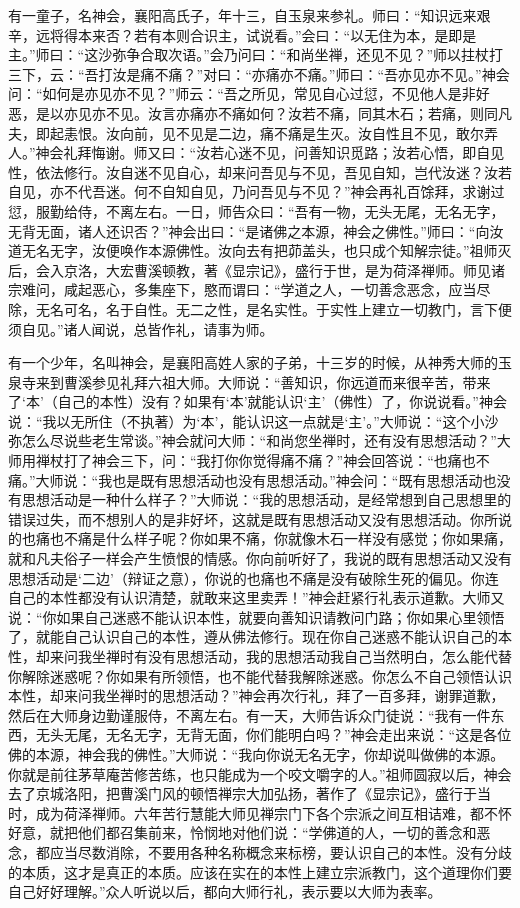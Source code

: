 \documentclass[12pt,twoside,openany]{book}
\newcommand{\kai}[1]{{\CJKfamily{kai}#1}}
\begin{document}
有一童子，名神会，襄阳高氏子，年十三，自玉泉来参礼。师曰：“知识远来艰辛，远将得本来否？若有本则合识主，试说看。”会曰：“以无住为本，是即是主。”师曰：“这沙弥争合取次语。”会乃问曰：“和尚坐禅，还见不见？”师以拄杖打三下，云：“吾打汝是痛不痛？”对曰：“亦痛亦不痛。”师曰：“吾亦见亦不见。”神会问：“如何是亦见亦不见？”师云：“吾之所见，常见自心过愆，不见他人是非好恶，是以亦见亦不见。汝言亦痛亦不痛如何？汝若不痛，同其木石；若痛，则同凡夫，即起恚恨。汝向前，见不见是二边，痛不痛是生灭。汝自性且不见，敢尔弄人。”神会礼拜悔谢。师又曰：“汝若心迷不见，问善知识觅路；汝若心悟，即自见性，依法修行。汝自迷不见自心，却来问吾见与不见，吾见自知，岂代汝迷？汝若自见，亦不代吾迷。何不自知自见，乃问吾见与不见？”神会再礼百馀拜，求谢过愆，服勤给侍，不离左右。一日，师告众曰：“吾有一物，无头无尾，无名无字，无背无面，诸人还识否？”神会出曰：“是诸佛之本源，神会之佛性。”师曰：“向汝道无名无字，汝便唤作本源佛性。汝向去有把茆盖头，也只成个知解宗徒。”祖师灭后，会入京洛，大宏曹溪顿教，著《显宗记》，盛行于世，是为荷泽禅师。师见诸宗难问，咸起恶心，多集座下，愍而谓曰：“学道之人，一切善念恶念，应当尽除，无名可名，名于自性。无二之性，是名实性。于实性上建立一切教门，言下便须自见。”诸人闻说，总皆作礼，请事为师。

\kai{有一个少年，名叫神会，是襄阳高姓人家的子弟，十三岁的时候，从神秀大师的玉泉寺来到曹溪参见礼拜六祖大师。大师说：“善知识，你远道而来很辛苦，带来了‘本’（自己的本性）没有？如果有‘本’就能认识‘主’（佛性）了，你说说看。”神会说：“我以无所住（不执著）为‘本’，能认识这一点就是‘主’。”大师说：“这个小沙弥怎么尽说些老生常谈。”神会就问大师：“和尚您坐禅时，还有没有思想活动？”大师用禅杖打了神会三下，问：“我打你你觉得痛不痛？”神会回答说：“也痛也不痛。”大师说：“我也是既有思想活动也没有思想活动。”神会问：“既有思想活动也没有思想活动是一种什么样子？”大师说：“我的思想活动，是经常想到自己思想里的错误过失，而不想别人的是非好坏，这就是既有思想活动又没有思想活动。你所说的也痛也不痛是什么样子呢？你如果不痛，你就像木石一样没有感觉；你如果痛，就和凡夫俗子一样会产生愤恨的情感。你向前听好了，我说的既有思想活动又没有思想活动是‘二边’（辩证之意），你说的也痛也不痛是没有破除生死的偏见。你连自己的本性都没有认识清楚，就敢来这里卖弄！”神会赶紧行礼表示道歉。大师又说：“你如果自己迷惑不能认识本性，就要向善知识请教问门路；你如果心里领悟了，就能自己认识自己的本性，遵从佛法修行。现在你自己迷惑不能认识自己的本性，却来问我坐禅时有没有思想活动，我的思想活动我自己当然明白，怎么能代替你解除迷惑呢？你如果有所领悟，也不能代替我解除迷惑。你怎么不自己领悟认识本性，却来问我坐禅时的思想活动？”神会再次行礼，拜了一百多拜，谢罪道歉，然后在大师身边勤谨服侍，不离左右。有一天，大师告诉众门徒说：“我有一件东西，无头无尾，无名无字，无背无面，你们能明白吗？”神会走出来说：“这是各位佛的本源，神会我的佛性。”大师说：“我向你说无名无字，你却说叫做佛的本源。你就是前往茅草庵苦修苦练，也只能成为一个咬文嚼字的人。”祖师圆寂以后，神会去了京城洛阳，把曹溪门风的顿悟禅宗大加弘扬，著作了《显宗记》，盛行于当时，成为荷泽禅师。六年苦行慧能大师见禅宗门下各个宗派之间互相诘难，都不怀好意，就把他们都召集前来，怜悯地对他们说：“学佛道的人，一切的善念和恶念，都应当尽数消除，不要用各种名称概念来标榜，要认识自己的本性。没有分歧的本质，这才是真正的本质。应该在实在的本性上建立宗派教门，这个道理你们要自己好好理解。”众人听说以后，都向大师行礼，表示要以大师为表率。}
\end{document}
